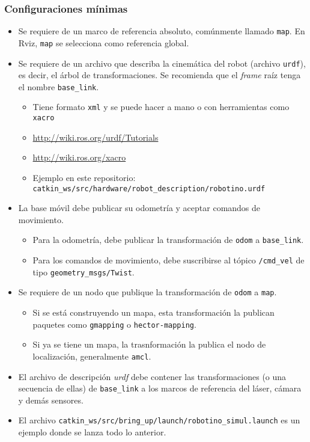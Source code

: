\documentclass[10pt,spanish,aspectratio=1610]{beamer}
\begin{document}
\begin{frame}\frametitle{Configuraciones mínimas}
  \begin{itemize}
    \item Se requiere de un marco de referencia absoluto, comúnmente llamado \texttt{map}. En Rviz, \texttt{map} se selecciona como referencia global.
  \item Se requiere de un archivo que describa la cinemática del robot (archivo \texttt{urdf}), es decir, el árbol de transformaciones. Se recomienda que el \textit{frame} raíz tenga el nombre \texttt{base\_link}.
    \begin{itemize}
    \item Tiene formato \texttt{xml} y se puede hacer a mano o con herramientas como \texttt{xacro}
    \item \url{http://wiki.ros.org/urdf/Tutorials}
    \item \url{http://wiki.ros.org/xacro}
    \item Ejemplo en este repositorio: \texttt{catkin\_ws/src/hardware/robot\_description/robotino.urdf}
    \end{itemize}
  \item La base móvil debe publicar su odometría y aceptar comandos de movimiento.
    \begin{itemize}
    \item Para la odometría, debe publicar la transformación de \texttt{odom} a \texttt{base\_link}.
    \item Para los comandos de movimiento, debe suscribirse al tópico \texttt{/cmd\_vel} de tipo \texttt{geometry\_msgs/Twist}.
    \end{itemize}
  \item Se requiere de un nodo que publique la transformación de \texttt{odom} a \texttt{map}.
    \begin{itemize}
    \item Si se está construyendo un mapa, esta transformación la publican paquetes como \texttt{gmapping} o \texttt{hector-mapping}.
    \item Si ya se tiene un mapa, la trasnformación la publica el nodo de localización, generalmente \texttt{amcl}. 
    \end{itemize}
  \item El archivo de descripción \textit{urdf} debe contener las transformaciones (o una secuencia de ellas) de \texttt{base\_link} a los marcos de referencia del láser, cámara y demás sensores.
  \item El archivo \texttt{catkin\_ws/src/bring\_up/launch/robotino\_simul.launch} es un ejemplo donde se lanza todo lo anterior. 
  \end{itemize}
\end{frame}
\end{document}
